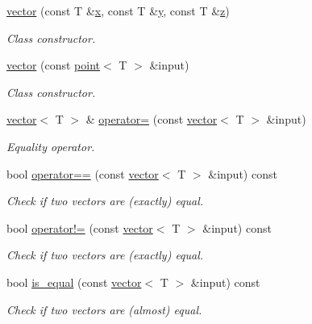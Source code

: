 \begin{DoxyCompactItemize}
\hyperlink{classddd_1_1vector_a90f097b576d026cb86b487546b841622}{vector} (const T \&\hyperlink{classddd_1_1vector_a1108468dc6ce04acf1d74949177c97b3}{x}, const T \&\hyperlink{classddd_1_1vector_a678928885fa7bcdb22f25eff71f74cdd}{y}, const T \&\hyperlink{classddd_1_1vector_a6f9a297e7ba387597ca0515421012166}{z})
\begin{DoxyCompactList}\small\item\em Class constructor. \end{DoxyCompactList}\item 
\hyperlink{classddd_1_1vector_a6a9abe67c1ec0259649dc4647614a62c}{vector} (const \hyperlink{classddd_1_1point}{point}$<$ T $>$ \&input)
\begin{DoxyCompactList}\small\item\em Class constructor. \end{DoxyCompactList}\item 
\hyperlink{classddd_1_1vector}{vector}$<$ T $>$ \& \hyperlink{classddd_1_1vector_a0aa127ccd971b78897b99b76f779f87c}{operator=} (const \hyperlink{classddd_1_1vector}{vector}$<$ T $>$ \&input)
\begin{DoxyCompactList}\small\item\em Equality operator. \end{DoxyCompactList}\item 
bool \hyperlink{classddd_1_1vector_a7595b24534ba95d03d9ace253a7c355f}{operator==} (const \hyperlink{classddd_1_1vector}{vector}$<$ T $>$ \&input) const
\begin{DoxyCompactList}\small\item\em Check if two vectors are (exactly) equal. \end{DoxyCompactList}\item 
bool \hyperlink{classddd_1_1vector_a8c18336941576daaff53568d424a27bd}{operator!=} (const \hyperlink{classddd_1_1vector}{vector}$<$ T $>$ \&input) const
\begin{DoxyCompactList}\small\item\em Check if two vectors are (exactly) equal. \end{DoxyCompactList}\item 
bool \hyperlink{classddd_1_1vector_a860847a7c7c93e52b4a83af722eb60f7}{is\+\_\+equal} (const \hyperlink{classddd_1_1vector}{vector}$<$ T $>$ \&input) const
\begin{DoxyCompactList}\small\item\em Check if two vectors are (almost) equal. \end{DoxyCompactList}\item 

\end{DoxyCompactItemize}
